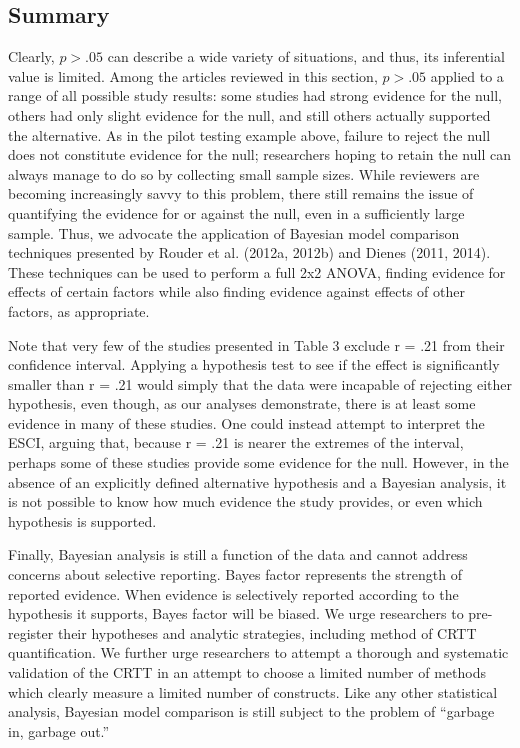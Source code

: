 \documentclass[fignum,nobf,man]{apa}
\begin{document}
\subsection{Summary}
Clearly, $p > .05$ can describe a wide variety of situations, and thus, its inferential value is limited. Among the articles reviewed in this section, $p > .05$ applied to a range of all possible study results: some studies had strong evidence for the null, others had only slight evidence for the null, and still others actually supported the alternative. As in the pilot testing example above, failure to reject the null does not constitute evidence for the null; researchers hoping to retain the null can always manage to do so by collecting small sample sizes. While reviewers are becoming increasingly savvy to this problem, there still remains the issue of quantifying the evidence for or against the null, even in a sufficiently large sample. Thus, we advocate the application of Bayesian model comparison techniques presented by Rouder et al. (2012a, 2012b) and Dienes (2011, 2014). These techniques can be used to perform a full 2x2 ANOVA, finding evidence for effects of certain factors while also finding evidence against effects of other factors, as appropriate.

Note that very few of the studies presented in Table 3 exclude r = .21 from their confidence interval. Applying a hypothesis test to see if the effect is significantly smaller than r = .21 would simply that the data were incapable of rejecting either hypothesis, even though, as our analyses demonstrate, there is at least some evidence in many of these studies. One could instead attempt to interpret the ESCI, arguing that, because r = .21 is nearer the extremes of the interval, perhaps some of these studies provide some evidence for the null. However, in the absence of an explicitly defined alternative hypothesis and a Bayesian analysis, it is not possible to know how much evidence the study provides, or even which hypothesis is supported.

Finally, Bayesian analysis is still a function of the data and cannot address concerns about selective reporting. Bayes factor represents the strength of reported evidence. When evidence is selectively reported according to the hypothesis it supports, Bayes factor will be biased. We urge researchers to pre-register their hypotheses and analytic strategies, including method of CRTT quantification. We further urge researchers to attempt a thorough and systematic validation of the CRTT in an attempt to choose a limited number of methods which clearly measure a limited number of constructs. Like any other statistical analysis, Bayesian model comparison is still subject to the problem of ``garbage in, garbage out.''
\end{document}
